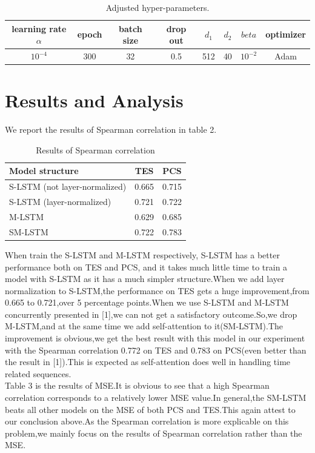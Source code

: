 \documentclass{article}
\begin{document}
\begin{table}[H]
	\centering
	\caption{Adjusted hyper-parameters.}
	\label{parameter}
	\begin{tabular}{cccccccc}
	\toprule
	learning rate $\alpha$ & epoch & batch size & drop out & $d_1$ & $d_2$ &  $beta$  & optimizer\\
	\midrule
	      $10^{-4}$        &  300  &     32     &    0.5   &  512  &    40   & $10^{-2}$ &  Adam \\
	\bottomrule
	\end{tabular}
\end{table}


\section{Results and Analysis}
We report the results of Spearman correlation in table 2.
\begin{table}[H]
  \caption{Results of Spearman correlation}
  \label{sc}
  \centering
  \begin{tabular}{lcc}
    \toprule
    
    Model structure     & TES     & PCS \\
    \midrule
    S-LSTM (not layer-normalized) & 0.665  & 0.715   \\
    S-LSTM (layer-normalized)    & 0.721 & 0.722      \\
    M-LSTM     & 0.629      &  0.685  \\
    SM-LSTM    & 0.722    &0.783\\
    \bottomrule
  \end{tabular}
\end{table}
When train the S-LSTM and M-LSTM respectively, S-LSTM has a better performance both on TES and PCS, and it takes much little time to train a model with S-LSTM as it has a much simpler structure.When we add layer normalization to S-LSTM,the performance on TES gets a huge improvement,from 0.665 to 0.721,over 5 percentage points.When we use S-LSTM and M-LSTM concurrently presented in [1],we can not get a satisfactory outcome.So,we drop M-LSTM,and at the same time we add self-attention to it(SM-LSTM).The improvement is obvious,we get the best result with this model in our experiment with the Spearman correlation 0.772 on TES and 0.783 on PCS(even better than the result in [1]).This is expected as self-attention does well in handling time related sequences.\\
Table 3 is the results of MSE.It is obvious to see that a high Spearman correlation corresponds to a relatively lower MSE value.In general,the SM-LSTM beats all other models on the MSE of both PCS and TES.This again attest to our conclusion above.As the Spearman correlation is more explicable on this problem,we mainly focus on the results of Spearman correlation rather than the MSE.
\end{document}
